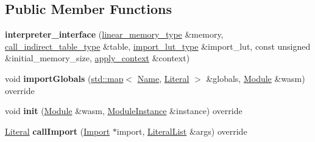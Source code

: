 \subsection*{Public Member Functions}
\begin{DoxyCompactItemize}
\item 
\mbox{\label{structaacio_1_1chain_1_1webassembly_1_1binaryen_1_1interpreter__interface_a6558d0ac39e5aa7d87c15de5badc5b39}} 
{\bfseries interpreter\+\_\+interface} (\mbox{\hyperlink{classfc_1_1array}{linear\+\_\+memory\+\_\+type}} \&memory, \mbox{\hyperlink{classstd_1_1vector}{call\+\_\+indirect\+\_\+table\+\_\+type}} \&table, \mbox{\hyperlink{classstd_1_1unordered__map}{import\+\_\+lut\+\_\+type}} \&import\+\_\+lut, const unsigned \&initial\+\_\+memory\+\_\+size, \mbox{\hyperlink{classaacio_1_1chain_1_1apply__context}{apply\+\_\+context}} \&context)
\item 
\mbox{\label{structaacio_1_1chain_1_1webassembly_1_1binaryen_1_1interpreter__interface_a4e61f0cef317815c7f70fac12f48274e}} 
void {\bfseries import\+Globals} (\mbox{\hyperlink{classstd_1_1map}{std\+::map}}$<$ \mbox{\hyperlink{structwasm_1_1_name}{Name}}, \mbox{\hyperlink{classwasm_1_1_literal}{Literal}} $>$ \&globals, \mbox{\hyperlink{classwasm_1_1_module}{Module}} \&wasm) override
\item 
\mbox{\label{structaacio_1_1chain_1_1webassembly_1_1binaryen_1_1interpreter__interface_acb3fba2a15a213db05779181d861be22}} 
void {\bfseries init} (\mbox{\hyperlink{classwasm_1_1_module}{Module}} \&wasm, \mbox{\hyperlink{classwasm_1_1_module_instance}{Module\+Instance}} \&instance) override
\item 
\mbox{\label{structaacio_1_1chain_1_1webassembly_1_1binaryen_1_1interpreter__interface_afc1eee6e5f0afd6e031e3365d9c10955}} 
\mbox{\hyperlink{classwasm_1_1_literal}{Literal}} {\bfseries call\+Import} (\mbox{\hyperlink{classwasm_1_1_import}{Import}} $\ast$import, \mbox{\hyperlink{classstd_1_1vector}{Literal\+List}} \&args) override
\item 
\mbox{\label{structaacio_1_1chain_1_1webassembly_1_1binaryen_1_1interpreter__interface_aa06085c4a742931b9ef304730f034631}} 

\end{DoxyCompactItemize}
